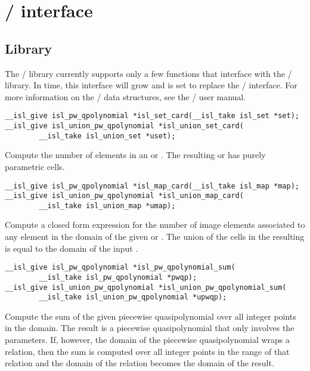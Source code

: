 \section{\protect\isl/ interface}

\subsection{Library}

The \barvinok/ library currently supports only a few
functions that interface with the \isl/ library.
In time, this interface will grow and is set to replace
the \PolyLib/ interface.
For more information on the \isl/ data structures, see
the \isl/ user manual.

\begin{verbatim}
__isl_give isl_pw_qpolynomial *isl_set_card(__isl_take isl_set *set);
__isl_give isl_union_pw_qpolynomial *isl_union_set_card(
        __isl_take isl_union_set *uset);
\end{verbatim}
Compute the number of elements in an 
or .
The resulting 
or  has purely parametric cells.

\begin{verbatim}
__isl_give isl_pw_qpolynomial *isl_map_card(__isl_take isl_map *map);
__isl_give isl_union_pw_qpolynomial *isl_union_map_card(
        __isl_take isl_union_map *umap);
\end{verbatim}
Compute a closed form expression for the number of image elements
associated to any element in the domain of the given 
or .
The union of the cells in the resulting 
is equal to the domain of the input .

\begin{verbatim}
__isl_give isl_pw_qpolynomial *isl_pw_qpolynomial_sum(
        __isl_take isl_pw_qpolynomial *pwqp);
__isl_give isl_union_pw_qpolynomial *isl_union_pw_qpolynomial_sum(
        __isl_take isl_union_pw_qpolynomial *upwqp);
\end{verbatim}
Compute the sum of the given piecewise quasipolynomial over
all integer points in the domain.  The result is a piecewise
quasipolynomial that only involves the parameters.
If, however, the domain of the piecewise quasipolynomial wraps
a relation, then the sum is computed over all integer points
in the range of that relation and the domain of the relation
becomes the domain of the result.

